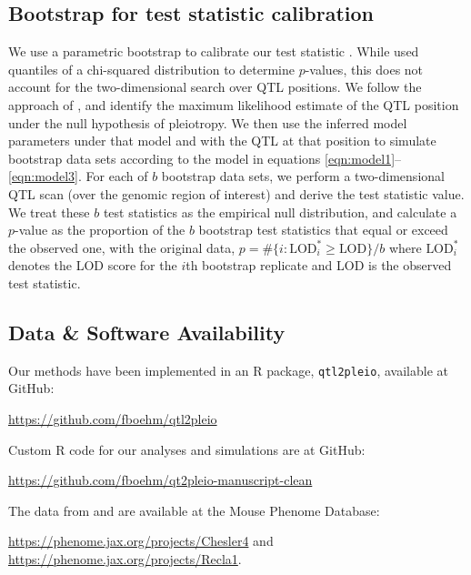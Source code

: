 \documentclass[oneside]{book}\usepackage[]{graphicx}\usepackage[]{color}
\begin{document}
\subsection{Bootstrap for test statistic calibration}

We use a parametric bootstrap to calibrate our test statistic
\citep{efron1979}. While \citet{jiang1995multiple} used quantiles of a
chi-squared distribution to determine $p$-values, this does not account
for the two-dimensional search over QTL positions.
We follow the approach of \citet{tian2016dissection}, and identify
the maximum likelihood estimate of the QTL position under the null
hypothesis of pleiotropy.
We then use the inferred model parameters under that model and with
the QTL at that position to simulate bootstrap data sets according to
the model in equations \ref{eqn:model1}--\ref{eqn:model3}.
For each of $b$ bootstrap data sets, we
perform a two-dimensional QTL scan (over the genomic region of
interest) and derive the test
statistic value. We treat these $b$ test statistics as the
empirical null distribution, and calculate a $p$-value as the
proportion of the $b$ bootstrap test statistics that equal or exceed
the observed one, with the original data,
$p = \# \{ i:\text{LOD}^*_i \geq \text{LOD}\} / b$
where $\text{LOD}_i^*$ denotes the LOD score for the $i$th bootstrap
replicate and LOD is the observed test statistic.



\subsection{Data \& Software Availability}

Our methods have been implemented in an R package, \texttt{qtl2pleio},
available at GitHub:

\href{https://github.com/fboehm/qtl2pleio}{https://github.com/fboehm/qtl2pleio}

\noindent Custom R code for our analyses and simulations are at GitHub:

\href{https://github.com/fboehm/qtl2pleio-manuscript-clean}{https://github.com/fboehm/qt2pleio-manuscript-clean}

\noindent The data from \citet{recla2014precise} and
\citet{logan2013high} are available at the Mouse Phenome Database:

\href{https://phenome.jax.org/projects/Chesler4}{https://phenome.jax.org/projects/Chesler4} and \href{https://phenome.jax.org/projects/Recla1}{https://phenome.jax.org/projects/Recla1}.
\end{document}
